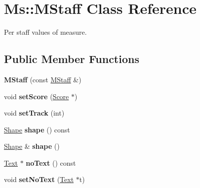 \hypertarget{class_ms_1_1_m_staff}{}\section{Ms\+:\+:M\+Staff Class Reference}
\label{class_ms_1_1_m_staff}


Per staff values of measure.  


\subsection*{Public Member Functions}
\begin{DoxyCompactItemize}
\item 
\mbox{\label{class_ms_1_1_m_staff_a44b094189add92868eec2fb68b7802c5}} 
{\bfseries M\+Staff} (const \hyperlink{class_ms_1_1_m_staff}{M\+Staff} \&)
\item 
\mbox{\label{class_ms_1_1_m_staff_a5c822eb5566827cf62ef1d4344be88d2}} 
void {\bfseries set\+Score} (\hyperlink{class_ms_1_1_score}{Score} $\ast$)
\item 
\mbox{\label{class_ms_1_1_m_staff_a2333afc43017bebe8316a6092ae26200}} 
void {\bfseries set\+Track} (int)
\item 
\mbox{\label{class_ms_1_1_m_staff_a19e0076b7f5179e9759297fa0988e48a}} 
\hyperlink{class_ms_1_1_shape}{Shape} {\bfseries shape} () const
\item 
\mbox{\label{class_ms_1_1_m_staff_ad0468d2682390f6a873bf8a5bca2e890}} 
\hyperlink{class_ms_1_1_shape}{Shape} \& {\bfseries shape} ()
\item 
\mbox{\label{class_ms_1_1_m_staff_ade7eae5ca8fe8d80324449ebc4bf5ea1}} 
\hyperlink{class_ms_1_1_text}{Text} $\ast$ {\bfseries no\+Text} () const
\item 
\mbox{\label{class_ms_1_1_m_staff_a664ace3bb181278e9fcd41ffb2ead400}} 
void {\bfseries set\+No\+Text} (\hyperlink{class_ms_1_1_text}{Text} $\ast$t)
\item 
\mbox{\label{class_ms_1_1_m_staff_a041c3a7ee0840b9da7d30a4df99b296f}} 

\end{DoxyCompactItemize}

